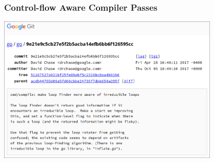 \documentclass[aspectratio=1610]{beamer}
\begin{document}
\begin{frame}
	\frametitle{Control-flow Aware Compiler Passes}

	\includegraphics[width=0.8\textwidth]{inc/applications/loop_finder.png}
\end{frame}
\end{document}
